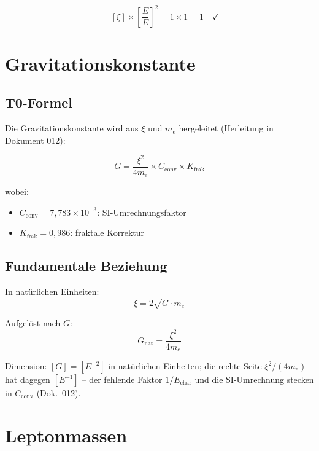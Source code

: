 	\begin{equation}
		[\alpha] = [\xi] \times \left[\frac{E}{E}\right]^2 = 1 \times 1 = 1 \quad \checkmark
	\end{equation}
	
	\section{Gravitationskonstante}
	\label{sec:gravitational_constant}
	
	\subsection{T0-Formel}
	
	Die Gravitationskonstante wird aus $\xi$ und $m_e$ hergeleitet (Herleitung in Dokument 012):
	
	\begin{equation}
		G = \frac{\xi^2}{4m_e} \times C_{\text{conv}} \times K_{\text{frak}}
		\label{eq:G_formula}
	\end{equation}
	
	wobei:
	\begin{itemize}
		\item $C_{\text{conv}} = 7{,}783\times10^{-3}$: SI-Umrechnungsfaktor
		\item $K_{\text{frak}} = 0{,}986$: fraktale Korrektur
	\end{itemize}
	
	\subsection{Fundamentale Beziehung}
	
	In natürlichen Einheiten:
	\begin{equation}
		\xi = 2\sqrt{G \cdot m_e}
	\end{equation}
	
	Aufgelöst nach $G$:
	\begin{equation}
		G_{\text{nat}} = \frac{\xi^2}{4m_e}
	\end{equation}
	
	Dimension: $[G] = [E^{-2}]$ in natürlichen Einheiten; die rechte Seite $\xi^2/(4m_e)$ hat dagegen $[E^{-1}]$ -- der fehlende Faktor $1/E_{\text{char}}$ und die SI-Umrechnung stecken in $C_{\text{conv}}$ (Dok.~012).
	
	\section{Leptonmassen}
	\label{sec:lepton_masses}
	
